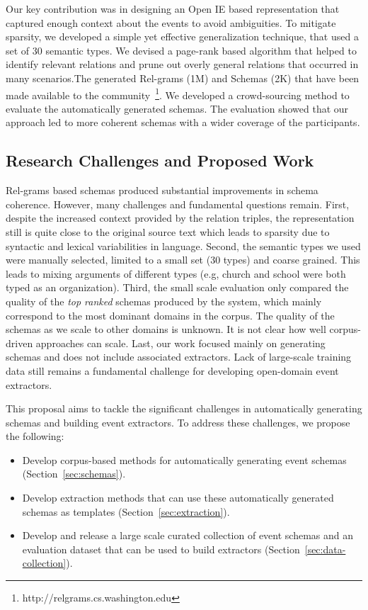 Our key contribution was in designing an Open IE based representation that captured enough context about the events to avoid ambiguities. To mitigate sparsity, we developed a simple yet effective generalization technique, that used a set of 30 semantic types. We devised a page-rank based algorithm that helped to identify relevant relations and prune out overly general relations that occurred in many scenarios.The generated Rel-grams (1M) and Schemas (2K) that have been made available to the community~\footnote{http://relgrams.cs.washington.edu}.  We developed a crowd-sourcing method to evaluate the automatically generated schemas. The evaluation showed that our approach led to more coherent schemas with a wider coverage of the participants. 

\subsection{Research Challenges and Proposed Work}

Rel-grams based schemas produced substantial improvements in schema coherence. However, many challenges and fundamental questions remain. First, despite the increased context provided by the relation triples, the representation still is quite close to the original source text which leads to sparsity due to syntactic and lexical variabilities in language. Second, the semantic types we used were manually selected, limited to a small set (30 types) and coarse grained. This leads to mixing arguments of different types (e.g, church and school were both typed as an organization). Third, the small scale evaluation only compared the quality of the {\em top ranked} schemas produced by the system, which mainly correspond to the most dominant domains in the corpus. The quality of the schemas as we scale to other domains is unknown. It is not clear how well corpus-driven approaches can scale. Last, our work focused mainly on generating schemas and does not include associated extractors. Lack of large-scale training data still remains a fundamental challenge for developing open-domain event extractors. 

This proposal aims to tackle the significant challenges in automatically generating schemas and building event extractors. 
To address these challenges, we propose the following:
\begin{itemize}
\item Develop corpus-based methods for automatically generating event schemas (Section~\ref{sec:schemas}).  
\item Develop extraction methods that can use these automatically generated schemas as templates (Section~\ref{sec:extraction}). 
\item Develop and release a large scale curated collection of event schemas and an evaluation dataset that can be used to build extractors (Section~\ref{sec:data-collection}).
\end{itemize}

